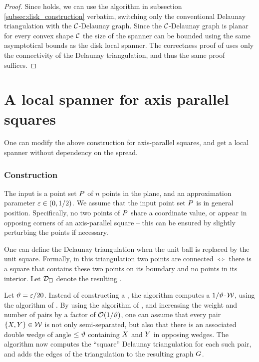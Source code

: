 \documentclass[12pt]{article}%
\begin{document}
\begin{proof}
	Since  holds, we can use the algorithm in subsection \ref{subsec:disk_construction} verbatim, switching only the conventional Delaunay triangulation with the $\mathcal{C}$-Delaunay graph. Since the $\mathcal{C}$-Delaunay graph is planar for every convex shape $\mathcal{C}$ the size of the spanner can be bounded using the same asymptotical bounds as the disk local spanner. The correctness proof of  uses only the connectivity of the Delaunay triangulation, and thus the same proof suffices.
	
\end{proof}






\section{A local spanner for axis parallel squares}
One can modify the above construction for axis-parallel squares, and
get a local spanner without dependency on the spread.

\subsubsection{Construction}

The input is a point set $P$ of $n$ points in the plane, and an
approximation parameter $\varepsilon \in (0,1/2)$.  We assume that the input
point set $P$ is in general position. Specifically, no two points of
$P$ share a coordinate value, or appear in opposing corners of an
axis-parallel square -- this can be ensured by slightly perturbing the
points if necessary.


One can define the Delaunay triangulation when the unit ball is
replaced by the unit square. Formally, in this triangulation two
points are connected $\iff$ there is a square that contains these two
points on its boundary and no points in its interior. Let
$\mathcal{D}_\square$ denote the resulting .

Let $\vartheta = \varepsilon/20$.  Instead of constructing a \WSPD, the algorithm
computes a $1/\vartheta$-\SSPD $\mathcal{W}$, using the algorithm of
. By using the algorithm of , and increasing the weight and number of pairs by a
factor of $\mathcal{O}(1/\vartheta)$,
one can assume that every pair $\{ X, Y \} \in \mathcal{W}$ is not only
semi-separated, but also that there is an associated double wedge of angle
$\leq \vartheta$ containing $X$ and $Y$ in opposing wedges.  The algorithm now computes the ``square'' Delaunay
triangulation for each such pair, and adds the edges of the
triangulation to the resulting graph $G$.
\end{document}
